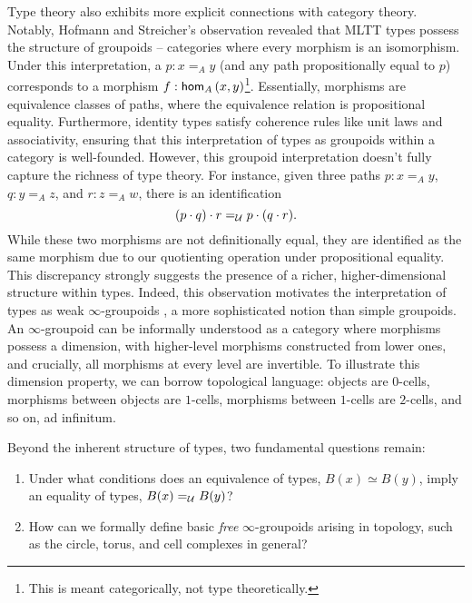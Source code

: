 \documentclass[main.tex]{subfiles}
\begin{document}
Type theory also exhibits more explicit connections with category theory. Notably, Hofmann and Streicher's observation \cite{hofmann1998groupoid} revealed that MLTT types possess the structure of groupoids – categories where every morphism is an isomorphism. Under this interpretation, a $p : x=_A y$ (and any path propositionally equal to $p$) corresponds to a morphism $f : \ho[A]{x}{y}$\footnote{This is meant categorically, not type theoretically.}. Essentially, morphisms are equivalence classes of paths, where the equivalence relation is propositional equality. Furthermore, identity types satisfy coherence rules like unit laws and associativity, ensuring that this interpretation of types as groupoids within a category is well-founded. However, this groupoid interpretation doesn't fully capture the richness of type theory. For instance, given three paths $p : x =_A y$, $q : y=_A z$, and $r : z =_A w$, there is an identification
 \[
 (p \cdot q) \cdot r =_\U p \cdot (q \cdot r).
 \]
While these two morphisms are not definitionally equal, they are identified as the same morphism due to our quotienting operation under propositional equality. This discrepancy strongly suggests the presence of a richer, higher-dimensional structure within types. Indeed, this observation motivates the interpretation of types as weak $\infty$-groupoids \cite{berg_garner_richard, AWODEY_2009, Gambino_2008, kapulkin2018simplicialmodelunivalentfoundations, Warren2008HomotopyTA}, a more sophisticated notion than simple groupoids. An $\infty$-groupoid can be informally understood as a category where morphisms possess a dimension, with higher-level morphisms constructed from lower ones, and crucially, all morphisms at every level are invertible. To illustrate this dimension property, we can borrow topological language: objects are $0$-cells, morphisms between objects are $1$-cells, morphisms between $1$-cells are $2$-cells, and so on, ad infinitum.

Beyond the inherent structure of types, two fundamental questions remain:
\begin{enumerate}
  \item Under what conditions does an equivalence of types, $B(x) \simeq B(y)$, imply an equality of types, $B(x)=_{\U} B(y)$?
  \item How can we formally define basic \textit{free} $\infty$-groupoids arising in topology, such as the circle, torus, and cell complexes in general?
\end{enumerate}
\end{document}
